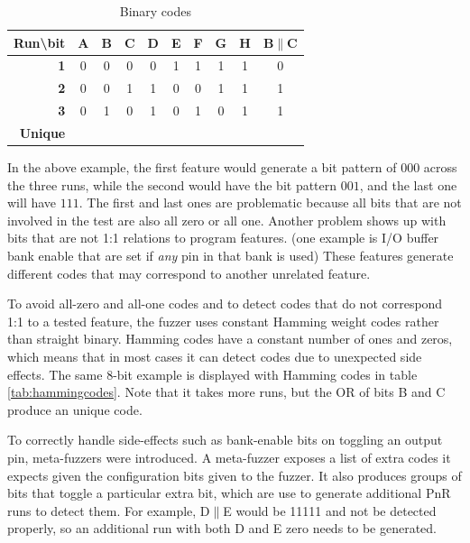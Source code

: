 \documentclass{article}
\newcommand{\cmark}{\ding{51}}%
\newcommand{\xmark}{\ding{55}}%
\begin{document}
\begin{table}[]
\centering
\caption{Binary codes}
\label{tab:binarycodes}
\begin{tabular}{r|ccccccccc}
\textbf{Run\textbackslash bit} & \textbf{A} & \textbf{B} & \textbf{C} & \textbf{D} & \textbf{E} & \textbf{F} & \textbf{G} & \textbf{H} & \textbf{B$\parallel$C} \\ \hline
\textbf{1}       & 0          & 0          & 0          & 0          & 1          & 1          & 1          & 1          & 0            \\
\textbf{2}       & 0          & 0          & 1          & 1          & 0          & 0          & 1          & 1          & 1            \\
\textbf{3}       & 0          & 1          & 0          & 1          & 0          & 1          & 0          & 1          & 1            \\ \hline
\textbf{Unique}  &\textbf{\xmark}&\textbf{\cmark}&\textbf{\cmark}&\textbf{\cmark}&\textbf{\cmark}&\textbf{\cmark}&\textbf{\cmark}&\textbf{\xmark}&\textbf{\xmark}             
\end{tabular}
\end{table}

In the above example, the first feature would generate a bit pattern of $000$ across the three runs, while the second would have the bit pattern $001$, and the last one will have $111$. The first and last ones are problematic because all bits that are not involved in the test are also all zero or all one. Another problem shows up with bits that are not 1:1 relations to program features. (one example is I/O buffer bank enable that are set if \textit{any} pin in that bank is used) These features generate different codes that may correspond to another unrelated feature.

To avoid all-zero and all-one codes and to detect codes that do not correspond 1:1 to a tested feature, the fuzzer uses constant Hamming weight codes rather than straight binary. Hamming codes have a constant number of ones and zeros, which means that in most cases it can detect codes due to unexpected side effects. The same 8-bit example is displayed with Hamming codes in table \ref{tab:hammingcodes}. Note that it takes more runs, but the OR of bits B and C produce an unique code.

To correctly handle side-effects such as bank-enable bits on toggling an output pin, meta-fuzzers were introduced. A meta-fuzzer exposes a list of extra codes it expects given the configuration bits given to the fuzzer. It also produces groups of bits that toggle a particular extra bit, which are use to generate additional PnR runs to detect them. For example, D$\parallel$E would be 11111 and not be detected properly, so an additional run with both D and E zero needs to be generated.
\end{document}
